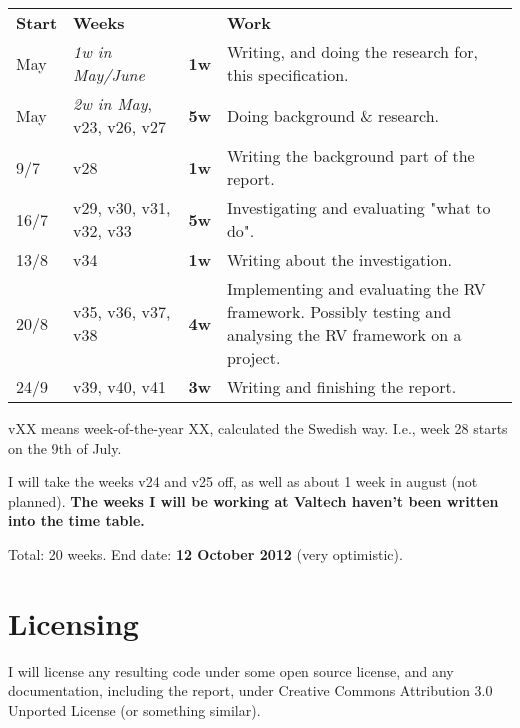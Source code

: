 \documentclass[a4paper,11pt]{article}
\begin{document}
\begin{center}
	\renewcommand{\arraystretch}{1.5}
	\begin{tabular}{ l l l | p{8cm} }
		\textbf{Start} & \textbf{Weeks} &  & \textbf{Work} \\
		\noalign{\smallskip}\hline\noalign{\smallskip}
		
		May & \textit{1w in May/June} & \textbf{1w} &
		Writing, and doing the research for, this specification.
		\\
		
		May & \textit{2w in May}, v23, v26, v27 & \textbf{5w} &
		Doing background \& research.
		\\
		
		9/7 & v28 & \textbf{1w} &
		Writing the background part of the report.
		\\
		
		16/7 & v29, v30, v31, v32, v33 & \textbf{5w} &
		Investigating and evaluating "what to do".
		\\
		
		13/8 & v34& \textbf{1w} &
		Writing about the investigation.
		\\
		
		20/8 & v35, v36, v37, v38 & \textbf{4w} &
		Implementing and evaluating the RV framework.
		Possibly testing and analysing the RV framework on a project.
		\\
		
		24/9 & v39, v40, v41 & \textbf{3w} &
		Writing and finishing the report.
		\\
		
	\end{tabular}
\end{center}

vXX means week-of-the-year XX, calculated the Swedish way. I.e., week 28 starts on the 9th of July.

I will take the weeks v24 and v25 off, as well as about 1 week in august (not planned).
\textbf{The weeks I will be working at Valtech haven't been written into the time table.}

Total: 20 weeks. End date: \textbf{12 October 2012} (very optimistic).

\section{Licensing}

I will license any resulting code under some open source license, and any documentation, including the report, under Creative Commons Attribution 3.0 Unported License \cite{cc-by} (or something similar).
\end{document}
